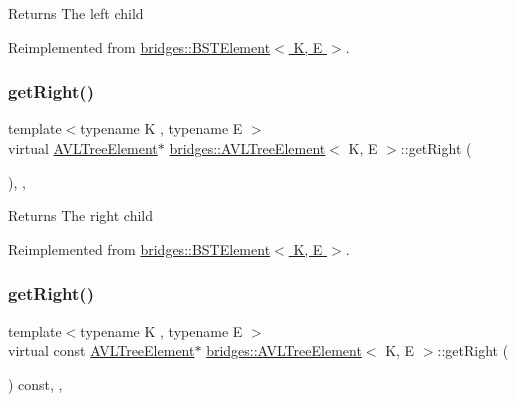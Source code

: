 \begin{DoxyReturn}{Returns}
The left child 
\end{DoxyReturn}


Reimplemented from \hyperlink{classbridges_1_1_b_s_t_element_a2abcfb991f6cc377da2bd9217319fc9c}{bridges\+::\+B\+S\+T\+Element$<$ K, E $>$}.

\hypertarget{classbridges_1_1_a_v_l_tree_element_a909b46ebf3e8c6a3434762a1f01499e2}{}\label{classbridges_1_1_a_v_l_tree_element_a909b46ebf3e8c6a3434762a1f01499e2} 
\subsubsection{\texorpdfstring{get\+Right()}{getRight()}\hspace{0.1cm}{\footnotesize\ttfamily [1/2]}}
{\footnotesize\ttfamily template$<$typename K , typename E $>$ \\
virtual \hyperlink{classbridges_1_1_a_v_l_tree_element}{A\+V\+L\+Tree\+Element}$\ast$ \hyperlink{classbridges_1_1_a_v_l_tree_element}{bridges\+::\+A\+V\+L\+Tree\+Element}$<$ K, E $>$\+::get\+Right (\begin{DoxyParamCaption}{ }\end{DoxyParamCaption})\hspace{0.3cm}{\ttfamily [inline]}, {\ttfamily [override]}, {\ttfamily [virtual]}}

\begin{DoxyReturn}{Returns}
The right child 
\end{DoxyReturn}


Reimplemented from \hyperlink{classbridges_1_1_b_s_t_element_a35e93bce32de933522dccde5f2b5ffd9}{bridges\+::\+B\+S\+T\+Element$<$ K, E $>$}.

\hypertarget{classbridges_1_1_a_v_l_tree_element_a2f6fd127f3a04fcc5be60299b7d98f12}{}\label{classbridges_1_1_a_v_l_tree_element_a2f6fd127f3a04fcc5be60299b7d98f12} 
\subsubsection{\texorpdfstring{get\+Right()}{getRight()}\hspace{0.1cm}{\footnotesize\ttfamily [2/2]}}
{\footnotesize\ttfamily template$<$typename K , typename E $>$ \\
virtual const \hyperlink{classbridges_1_1_a_v_l_tree_element}{A\+V\+L\+Tree\+Element}$\ast$ \hyperlink{classbridges_1_1_a_v_l_tree_element}{bridges\+::\+A\+V\+L\+Tree\+Element}$<$ K, E $>$\+::get\+Right (\begin{DoxyParamCaption}{ }\end{DoxyParamCaption}) const\hspace{0.3cm}{\ttfamily [inline]}, {\ttfamily [override]}, {\ttfamily [virtual]}}

